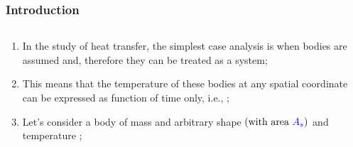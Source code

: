 \documentclass[10pt,compress,handout,ignorenonframetext,unknownkeysallowed]{beamer}
\begin{document}
\begin{frame}
 \frametitle{Introduction}
   \begin{columns}
     \begin{column}[l]{0.5\linewidth}
         \begin{center}
         \end{center}
     \end{column}
     \begin{column}[l]{0.5\linewidth}
         \begin{flushleft}
         \end{flushleft}
     \end{column}         
   \end{columns}
%
        \begin{enumerate}
           \item<1-> In the study of heat transfer, the simplest case analysis is when bodies are assumed  and, therefore they can be treated as a  system;
           \item<2-> This means that the temperature of these bodies at any spatial coordinate can be expressed as function of time only, i.e., ; 
           \item<4-> Let's consider a body of mass  and arbitrary shape $\left(\text{with area } \textcolor{blue}{A_{s}}\right)$ and temperature ;
        \end{enumerate}
\end{frame}
\end{document}
